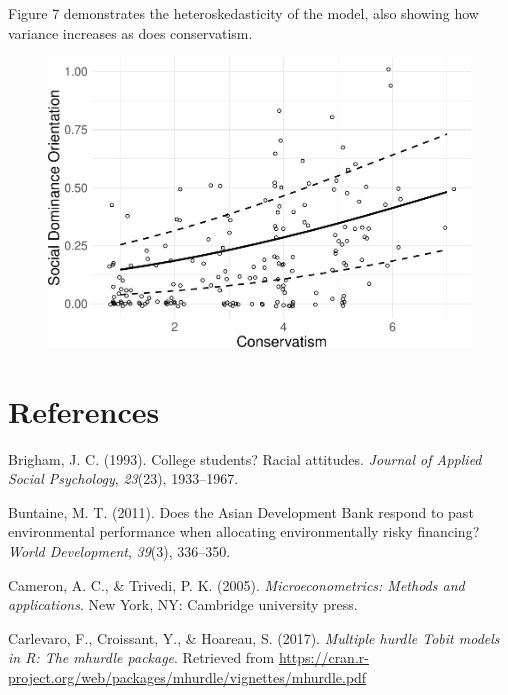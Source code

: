 \documentclass[english,man]{apa6}
\theoremstyle{definition}
\theoremstyle{definition}
\theoremstyle{remark}
\begin{document}
Figure 7 demonstrates the heteroskedasticity of the model, also showing
how variance increases as does conservatism.

\begin{figure}
\centering
\includegraphics{beta_hurdle_files/figure-latex/unnamed-chunk-18-1.pdf}
\caption{}
\end{figure}

\newpage

\section{References}\label{references}

\setlength{\parindent}{-0.5in} \setlength{\leftskip}{0.5in}

\hypertarget{refs}{}
\hypertarget{ref-brigham1993college}{}
Brigham, J. C. (1993). College students? Racial attitudes. \emph{Journal
of Applied Social Psychology}, \emph{23}(23), 1933--1967.

\hypertarget{ref-buntaine2011does}{}
Buntaine, M. T. (2011). Does the Asian Development Bank respond to past
environmental performance when allocating environmentally risky
financing? \emph{World Development}, \emph{39}(3), 336--350.

\hypertarget{ref-cameron2005microeconometrics}{}
Cameron, A. C., \& Trivedi, P. K. (2005). \emph{Microeconometrics:
Methods and applications}. New York, NY: Cambridge university press.

\hypertarget{ref-carlevaro2016multiple}{}
Carlevaro, F., Croissant, Y., \& Hoareau, S. (2017). \emph{Multiple
hurdle Tobit models in R: The mhurdle package}. Retrieved from
\url{https://cran.r-project.org/web/packages/mhurdle/vignettes/mhurdle.pdf}
\end{document}
